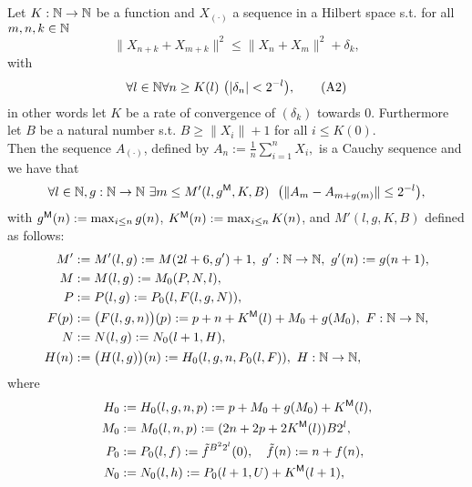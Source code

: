 \begin{prop} \label{p:fin}

Let $K:\mathbb{N}\to\mathbb{N}$ be a function and $X_{(\cdot)}$ a sequence in a Hilbert space s.t. for all $m,n,k\in\mathbb{N}$
\[
\|X_{n+k} + X_{m+k}\|^2 \leq \|X_{n} + X_{m}\|^2+\delta_k,\label{one}\tag{A1}
\]
with
\[
\forall l\in\mathbb{N}\forall n\geq K(l)\ \big( |\delta_{n}|<2^{-l}\big),\label{two}\tag{A2}
\]
in other words let $K$ be a rate of convergence of $(\delta_k)$ towards 0.
Furthermore let $B$ be a natural number s.t. $B\geq \|X_i\|+1$ for all $i\leq K(0)$.\\
Then the sequence $A_{(\cdot)}$, defined by
$
A_n:=\frac{1}{n}\sum^n_{i=1}X_i,
$
is a Cauchy sequence and we have that
\[
\forall l\in\mathbb{N},g:\mathbb{N}\to\mathbb{N}\ \exists m\leq M'(l,g\protect{^{\textsf{\upshape M}}},K,B)\ \ \big( \|A_{m}-A_{m+g(m)}\|\leq 2^{-l} \big),
\]
with $g\protect{^{\textsf{\upshape M}}}(n):=\max_{i\leq n} g(n)$, $K\protect{^{\textsf{\upshape M}}}(n):=\max_{i\leq n} K(n)$, and $M'(l,g,K,B)$ defined as follows:
%
\begin{align*}
M'&:=M'(l,g):=M(2l+6, g')+1,\ g':\NN\to\NN,\ g'(n):=g(n+1),\\ %
M&:=M(l,g):=M_0( P, N, l),\\
P&:=P(l,g):=P_0(l,F(l,g,N)),\\
F(p)&:=\big(F(l,g,n)\big)(p):=p+n+K\powM(l)+M_0+g(M_0),\ F:\NN\to\NN,\\
N&:=N(l,g):=N_0(l+1,H), \\
H(n)&:=\big(H(l,g)\big)(n):= H_0(l,g,n,P_0(l,F)),\ H:\NN\to\NN,
\end{align*}
where
\begin{align*}
 H_0&:=H_0(l,g,n,p):= p + M_0+g(M_0)+K\powM(l),\\
 M_0&:=M_0(l,n,p):=(2n + 2p + 2K\powM(l))B2^{l},\\
 P_0&:=P_0(l,f):=\tilde f^{B^22^l}(0),\quad \tilde f(n):=n + f(n),\\
 N_0&:=N_0(l,h):=P_0(l+1,U)+K\powM(l+1), \\

\end{align*}
\end{prop}

